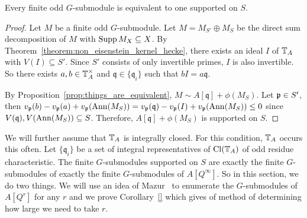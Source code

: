 \documentclass{article}
\renewcommand{\q}{\mathfrak{q}}
\begin{document}
\begin{corollary}%
    \label{cor:bound_support}
    Every finite odd $G$-submodule is equivalent to one supported on $S$.
\end{corollary}
\begin{proof}
    Let $M$ be a finite odd $G$-submodule. Let $M=M_{S'}\oplus M_S$ be the
    direct sum decomposition of $M$ with $\operatorname{Supp} M_X \subseteq X$. By
    Theorem~\ref{theorem:non_eisenstein_kernel_hecke}, there exists an ideal
    $I$ of $\mathbb{T}_A$ with $V(I)\subseteq S'$. Since $S'$ consists of only
    invertible primes, $I$ is also invertible. So there exists $a,b\in \mathbb{T}_A
    ^\times$ and $\q\in \{\q_i\}$ such that $bI = a\q$.

    By Proposition~\ref{prop:things_are_equivalent}, $M\sim A[\q]+\phi(M_S)$.
    Let $\mathfrak{p}\in S'$, then
    $v_\p(b)-v_\p(a)+v_\p(\Ann(M_S))=v_\p(\q)-v_\p(I)+v_\p(\Ann(M_S)) \leq 0$
    since $V(\q),V(\Ann(M_S))\subseteq S$. Therefore, $A[\q]+\phi(M_S)$ is
    supported on $S$.
\end{proof}

We will further assume that $\mathbb{T}_A$ is integrally closed. For this condition,
$\mathbb{T}_A$ occurs this often. Let $\{\q_i\}$ be a set of integral representatives
of $\operatorname{Cl}(\mathbb{T}_A)$ of odd residue characteristic. The finite $G$-submodules
supported on $S$ are exactly the finite $G$-submodules of exactly the finite
$G$-submodules of $A[Q^\infty]$. So in this section, we do two things. We will
use an idea of Mazur~\cite[pg. 112]{mazur:eisenstein} to enumerate the
$G$-submodules of $A[Q^r]$ for any $r$ and we prove Corollary~\ref{} which
gives of method of determining how large we need to take $r$.
\end{document}
